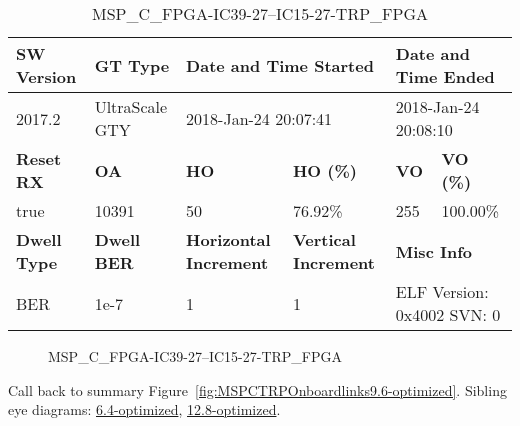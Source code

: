 \begin{table}[h]
\centering
\caption{MSP\_C\_FPGA-IC39-27--IC15-27-TRP\_FPGA}
\label{tab:MSPCFPGAIC3927IC1527TRPFPGA9.6-optimized}
\begin{tabular}{@{}|l|l|l|l|l|l|@{}}
\toprule
\textbf{SW Version}                & \textbf{GT Type}   & \multicolumn{2}{l|}{\textbf{Date and Time Started}}            & \multicolumn{2}{l|}{\textbf{Date and Time Ended}}        \\ \midrule
2017.2                       & UltraScale GTY          & \multicolumn{2}{l|}{2018-Jan-24 20:07:41}                   & \multicolumn{2}{l|}{2018-Jan-24 20:08:10}               \\ \midrule
\textbf{Reset RX}                  & \textbf{OA} & \textbf{HO}   & \textbf{HO (\%)} & \textbf{VO} & \textbf{VO (\%)} \\ \midrule
true & 10391        & 50          & 76.92\%        & 255        & 100.00\%       \\ \midrule
\textbf{Dwell Type}                & \textbf{Dwell BER} & \textbf{Horizontal Increment} & \textbf{Vertical Increment}    & \multicolumn{2}{l|}{\textbf{Misc Info}}                  \\ \midrule
BER                            & 1e-7        & 1        & 1           & \multicolumn{2}{l|}{ELF Version: 0x4002 SVN: 0}                         \\ \bottomrule
\end{tabular}
\end{table}

\begin{figure}[h]
\caption{MSP\_C\_FPGA-IC39-27--IC15-27-TRP\_FPGA} \label{fig:MSPCFPGAIC3927IC1527TRPFPGA9.6-optimized}
\end{figure}

Call back to summary Figure~\ref{fig:MSPCTRPOnboardlinks9.6-optimized}.
Sibling eye diagrams: \hyperref[sec:MSPCFPGAIC3927IC1527TRPFPGA6.4-optimized]{6.4-optimized}, \hyperref[sec:MSPCFPGAIC3927IC1527TRPFPGA12.8-optimized]{12.8-optimized}.

\clearpage
\newpage

